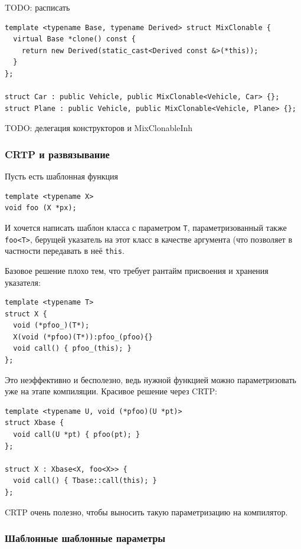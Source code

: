 \documentclass[a4paper,12pt,oneside]{article}
\begin{document}
TODO: расписать 

\begin{lstlisting}
template <typename Base, typename Derived> struct MixClonable {
  virtual Base *clone() const {
    return new Derived(static_cast<Derived const &>(*this));
  }
};

struct Car : public Vehicle, public MixClonable<Vehicle, Car> {}; 
struct Plane : public Vehicle, public MixClonable<Vehicle, Plane> {};
\end{lstlisting}

TODO: делегация конструкторов и MixClonableInh

\subsubsection{CRTP и развязывание}\label{VasilCase}

Пусть есть шаблонная функция

\begin{lstlisting}
template <typename X>
void foo (X *px);
\end{lstlisting}

И хочется написать шаблон класса с параметром \lstinline!T!, параметризованный также \lstinline!foo<T>!, берущей указатель на этот класс в качестве аргумента (что позволяет в частности передавать в неё \lstinline!this!.

Базовое решение плохо тем, что требует рантайм присвоения и хранения указателя:

\begin{lstlisting}
template <typename T>
struct X {
  void (*pfoo_)(T*);
  X(void (*pfoo)(T*)):pfoo_(pfoo){}
  void call() { pfoo_(this); }
};
\end{lstlisting}

Это неэффективно и бесполезно, ведь нужной функцией можно параметризовать уже на этапе компиляции. Красивое решение через CRTP:

\begin{lstlisting}
template <typename U, void (*pfoo)(U *pt)> 
struct Xbase {
  void call(U *pt) { pfoo(pt); }
};

struct X : Xbase<X, foo<X>> {
  void call() { Tbase::call(this); }
};
\end{lstlisting}

CRTP очень полезно, чтобы выносить такую параметризацию на компилятор.

\subsubsection{Шаблонные шаблонные параметры}\label{TemplateTemplateArguments}
\end{document}
